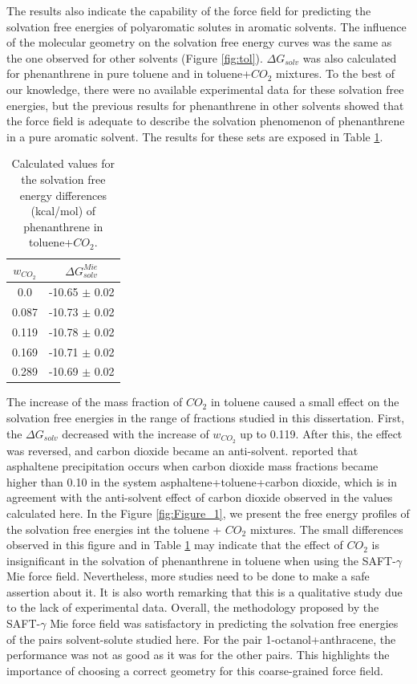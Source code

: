  The results also indicate the capability of the force field for predicting the solvation free energies of polyaromatic solutes in aromatic solvents. The influence of the molecular geometry on the solvation free energy curves was the same as the one observed for other solvents (Figure \ref{fig:tol}). $\Delta G_{solv}$ was also calculated for phenanthrene in pure toluene and in toluene+$CO_{2}$ mixtures. To the best of our knowledge, there were no available experimental data for these solvation free energies, but the previous results for phenanthrene in other solvents showed that the force field is adequate to describe the solvation phenomenon of phenanthrene in a pure aromatic solvent. The results for these sets are exposed in Table \ref{tbl:solvco2}.  
 
\FloatBarrier
\begin{table}[H]
\centering
  \caption{Calculated values for the solvation free energy differences (kcal/mol) of phenanthrene in toluene+$CO_{2}$.}
  \label{tbl:solvco2}
  \begin{tabular}{cc}
    \hline
    \hline
      $w_{CO_{2}}$ & $\Delta G_{solv}^{Mie}$ \\
    \hline\hline
    0.0    & -10.65 $\pm$ 0.02   \\
    0.087  & -10.73 $\pm$ 0.02   \\
    0.119  & -10.78 $\pm$ 0.02   \\
    0.169  & -10.71 $\pm$ 0.02   \\
    0.289  & -10.69 $\pm$ 0.02   \\
    \hline
    \hline
  \end{tabular}
\end{table}
\FloatBarrier

The increase of the mass fraction of $CO_{2}$ in toluene caused a small effect on the solvation free energies in the range of fractions studied in this dissertation. First, the $\Delta G_{solv}$ decreased with the increase of $w_{CO_{2}}$ up to 0.119. After this, the effect was reversed, and carbon dioxide became an anti-solvent.  reported that asphaltene precipitation occurs when carbon dioxide mass fractions became higher than 0.10 in the system asphaltene+toluene+carbon dioxide, which is in agreement with the anti-solvent effect of carbon dioxide observed in the values calculated here. In the Figure \ref{fig:Figure_1}, we present the free energy profiles of the solvation free energies int the toluene + $CO_{2}$ mixtures. The small differences observed in this figure and in Table \ref{tbl:solvco2} may indicate that the effect of $CO_{2}$ is insignificant in the solvation of phenanthrene in toluene when using the SAFT-$\gamma$ Mie force field. Nevertheless, more studies need to be done to make a safe assertion about it. It is also worth remarking that this is a qualitative study due to the lack of experimental data. Overall, the methodology proposed by the SAFT-$\gamma$ Mie force field was satisfactory in predicting the solvation free energies of the pairs solvent-solute studied here. For the pair 1-octanol+anthracene, the performance was not as good as it was for the other pairs. This highlights the importance of choosing a correct geometry for this coarse-grained force field.    


